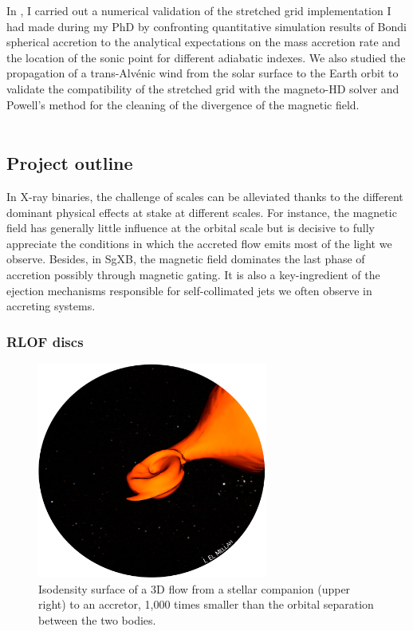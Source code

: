\documentclass[a4paper,12pt,onecolumn]{article}
\begin{document}
\indent In \cite{Xia2017}, I carried out a numerical validation of the stretched grid implementation I had made during my PhD by confronting quantitative simulation results of Bondi spherical accretion to the analytical expectations on the mass accretion rate and the location of the sonic point for different adiabatic indexes. We also studied the propagation of a trans-Alv\'enic wind from the solar surface to the Earth orbit to validate the compatibility of the stretched grid with the magneto-HD solver and Powell's method for the cleaning of the divergence of the magnetic field.\\ \\

\subsection*{Project outline}

In X-ray binaries, the challenge of scales can be alleviated thanks to the different dominant physical effects at stake at different scales. For instance, the magnetic field has generally little influence at the orbital scale but is decisive to fully appreciate the conditions in which the accreted flow emits most of the light we observe. Besides, in SgXB, the magnetic field dominates the last phase of accretion possibly through magnetic gating. It is also a key-ingredient of the ejection mechanisms responsible for self-collimated jets we often observe in accreting systems.

\subsubsection*{RLOF discs}

\begin{figure}
\vspace*{-1.5cm}
\hspace*{0.1cm}
\includegraphics[height=7.1cm]{Figures/RLOF.png}
\caption{Isodensity surface of a 3D flow from a stellar companion (upper right) to an accretor, 1,000 times smaller than the orbital separation between the two bodies.}
\label{fig:bow2.5d}
\end{figure} 
\end{document}
